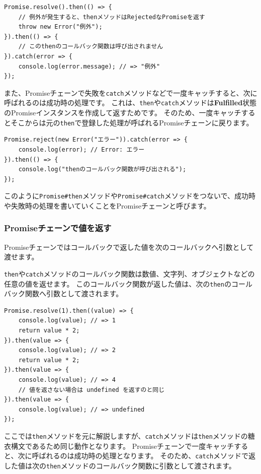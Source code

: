 \begin{lstlisting}
Promise.resolve().then(() => { 
    // 例外が発生すると、thenメソッドはRejectedなPromiseを返す
    throw new Error("例外");
}).then(() => {
    // このthenのコールバック関数は呼び出されません
}).catch(error => {
    console.log(error.message); // => "例外"
});
\end{lstlisting}

また、Promiseチェーンで失敗を\texttt{catch}メソッドなどで一度キャッチすると、次に呼ばれるのは成功時の処理です。
これは、\texttt{then}や\texttt{catch}メソッドは\textbf{Fulfilled}状態のPromiseインスタンスを作成して返すためです。
そのため、一度キャッチするとそこからは元の\texttt{then}で登録した処理が呼ばれるPromiseチェーンに戻ります。

\begin{lstlisting}
Promise.reject(new Error("エラー")).catch(error => {
    console.log(error); // Error: エラー
}).then(() => {
    console.log("thenのコールバック関数が呼び出される");
});
\end{lstlisting}

このように\texttt{Promise\#then}メソッドや\texttt{Promise\#catch}メソッドをつないで、成功時や失敗時の処理を書いていくことをPromiseチェーンと呼びます。\enlargethispage{\baselineskip}

\hypertarget{promise-chain-value}{%
\subsubsection{Promiseチェーンで値を返す}\label{promise-chain-value}}

Promiseチェーンではコールバックで返した値を次のコールバックへ引数として渡せます。

\texttt{then}や\texttt{catch}メソッドのコールバック関数は数値、文字列、オブジェクトなどの任意の値を返せます。
このコールバック関数が返した値は、次の\texttt{then}のコールバック関数へ引数として渡されます。

\begin{lstlisting}
Promise.resolve(1).then((value) => {
    console.log(value); // => 1
    return value * 2;
}).then(value => {
    console.log(value); // => 2
    return value * 2;
}).then(value => {
    console.log(value); // => 4
    // 値を返さない場合は undefined を返すのと同じ
}).then(value => {
    console.log(value); // => undefined
});
\end{lstlisting}

ここでは\texttt{then}メソッドを元に解説しますが、\texttt{catch}メソッドは\texttt{then}メソッドの糖衣構文であるため同じ動作となります。
Promiseチェーンで一度キャッチすると、次に呼ばれるのは成功時の処理となります。
そのため、\texttt{catch}メソッドで返した値は次の\texttt{then}メソッドのコールバック関数に引数として渡されます。

